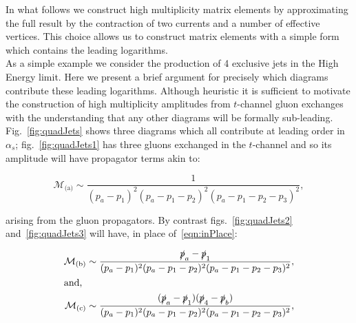 	In what follows we construct high multiplicity matrix elements by approximating the full result
	by the contraction of two currents and a number of effective vertices.  This choice allows us
	to construct matrix elements with a simple form which contains the leading logarithms.\\
	As a simple example we consider the production of 4 exclusive jets in the High Energy limit.
	Here we present a brief argument for precisely which diagrams contribute these leading logarithms.
	Although heuristic it is sufficient to motivate the construction of high multiplicity amplitudes from
	$t$-channel gluon exchanges with the understanding that any other diagrams will be formally sub-leading.
	Fig.~\eqref{fig:quadJets} shows three diagrams which all contribute at leading order in $\alpha_s$;
	fig.~\eqref{fig:quadJets1} has three gluons exchanged in the $t$-channel and so its amplitude will
	have propagator terms akin to:

	\begin{equation}
		\mathcal{M}_{\text{(a)}}\sim\frac{1}{(p_a - p_1)^2(p_a - p_1 - p_2)^2(p_a - p_1 - p_2 - p_3)^2},
		\label{eqn:inPlace}
	\end{equation}

	arising from the gluon propagators.  By contrast figs.~\eqref{fig:quadJets2} and~\eqref{fig:quadJets3} will
	have, in place of~\eqref{eqn:inPlace}:

	\begin{align}
		\mathcal{M}_{\text{(b)}}\sim\frac{\slashed p_a - \slashed p_1}
		{(p_a - p_1)^2(p_a - p_1 - p_2)^2(p_a - p_1 - p_2 - p_3)^2},\\
		\intertext{and,}
		\mathcal{M}_{\text{(c)}}\sim\frac{(\slashed p_a - \slashed p_1)(\slashed p_4 - \slashed p_b)}
		{(p_a - p_1)^2(p_a - p_1 - p_2)^2(p_a - p_1 - p_2 - p_3)^2},
	\end{align}

